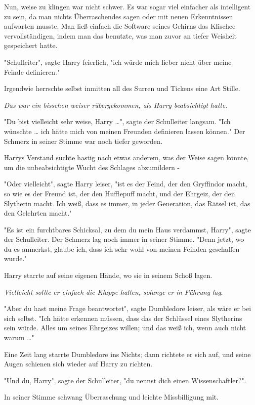 {Nun, weise zu klingen war nicht schwer. Es war sogar viel einfacher als intelligent zu sein, da man nichts Überraschendes sagen oder mit neuen Erkenntnissen aufwarten musste. Man ließ einfach die Software seines Gehirns das Klischee vervollständigen, indem man das benutzte, was man zuvor an tiefer Weisheit gespeichert hatte.

"Schulleiter", sagte Harry feierlich, "ich würde mich lieber nicht über meine Feinde definieren."

Irgendwie herrschte selbst inmitten all des Surren und Tickens eine Art Stille.

\emph{Das war ein bisschen weiser rübergekommen, als Harry beabsichtigt hatte.}

"Du bist vielleicht sehr weise, Harry …", sagte der Schulleiter langsam. "Ich wünschte … ich hätte mich von meinen Freunden definieren lassen können." Der Schmerz in seiner Stimme war noch tiefer geworden.

Harrys Verstand suchte hastig nach etwas anderem, was der Weise sagen könnte, um die unbeabsichtigte Wucht des Schlages abzumildern -

"Oder vielleicht", sagte Harry leiser, "ist es der Feind, der den Gryffindor macht, so wie es der Freund ist, der den Hufflepuff macht, und der Ehrgeiz, der den Slytherin macht. Ich weiß, dass es immer, in jeder Generation, das Rätsel ist, das den Gelehrten macht."

"Es ist ein furchtbares Schicksal, zu dem du mein Haus verdammst, Harry", sagte der Schulleiter. Der Schmerz lag noch immer in seiner Stimme. "Denn jetzt, wo du es anmerkst, glaube ich, dass ich sehr wohl von meinen Feinden geschaffen wurde."

Harry starrte auf seine eigenen Hände, wo sie in seinem Schoß lagen.

\emph{Vielleicht sollte er einfach die Klappe halten, solange er in Führung lag}.

"Aber du hast meine Frage beantwortet", sagte Dumbledore leiser, als wäre er bei sich selbst. "Ich hätte erkennen müssen, dass das der Schlüssel eines Slytherins sein würde. Alles um seines Ehrgeizes willen; und das weiß ich, wenn auch nicht warum …"

Eine Zeit lang starrte Dumbledore ins Nichts; dann richtete er sich auf, und seine Augen schienen sich wieder auf Harry zu richten.

"Und du, Harry", sagte der Schulleiter, "du nennst dich einen Wissenschaftler?".

In seiner Stimme schwang Überraschung und leichte Missbilligung mit.

}
